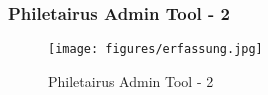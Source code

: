 \begin{frame}
\frametitle{Philetairus Admin Tool - 2}

\begin{figure}
  \texttt{[image: figures/erfassung.jpg]}
  \caption{Philetairus Admin Tool - 2}
  \label{fig:phileadmin2}
\end{figure}

\end{frame}




